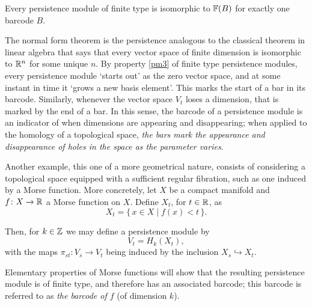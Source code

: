 \begin{theorem}
Every persistence module of finite type is isomorphic to $\mathbb{F}(B)$ for exactly one barcode $B$.
\end{theorem}

The normal form theorem is the persistence analogous to the classical theorem in linear algebra that says that every vector space of finite dimension is isomorphic to $\mathbb{R}^n$ for some unique $n$. By property \ref{pm3} of finite type persistence modules, every persistence module `starts out' as the zero vector space, and at some instant in time it `grows a new basis element'. This marks the start of a bar in its barcode. Similarly, whenever the vector space $V_t$ loses a dimension, that is marked by the end of a bar. In this sense, the barcode of a persistence module is an indicator of when dimensions are appearing and disappearing; when applied to the homology of a topological space, \emph{the bars mark the appearance and disappearance of holes in the space as the parameter varies}.

\medskip

Another example, this one of a more geometrical nature, consists of considering a topological space equipped with a sufficient regular fibration, such as one induced by a Morse function. More concretely, let $X$ be a compact manifold and $f \colon X \to \mathbb{R}$ a Morse function on $X$. Define $X_t$, for $t \in \mathbb{R}$, as
\begin{equation}
X_t = \{\, x \in X \mid f(x) < t \,\}.
\end{equation}

Then, for $k \in \mathbb{Z}$ we may define a persistence module by
\begin{equation}
V_t = H_k(X_t),
\end{equation}
with the maps $\pi_{st} \colon V_s \to V_t$ being induced by the inclusion $X_s \hookrightarrow X_t$.

Elementary properties of Morse functions will show that the resulting persistence module is of finite type, and therefore has an associated barcode; this barcode is referred to as \emph{the barcode of $f$} (of dimension $k$).

